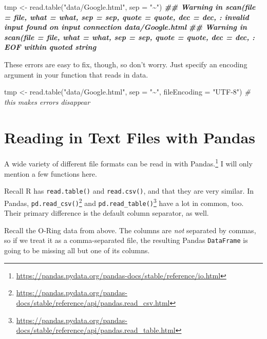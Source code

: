 \documentclass[
  12pt,
  krantz2]{krantz}
\makeatletter
\newenvironment{Shaded}{\begin{snugshade}}{\end{snugshade}}
\newcommand{\AttributeTok}[1]{\textcolor[rgb]{0.61,0.61,0.61}{#1}}
\newcommand{\CommentTok}[1]{\textcolor[rgb]{0.37,0.37,0.37}{\textit{#1}}}
\newcommand{\DocumentationTok}[1]{\textcolor[rgb]{0.37,0.37,0.37}{\textbf{\textit{#1}}}}
\newcommand{\FunctionTok}[1]{\textcolor[rgb]{0,0,0}{#1}}
\newcommand{\NormalTok}[1]{#1}
\newcommand{\OtherTok}[1]{\textcolor[rgb]{0.37,0.37,0.37}{#1}}
\newcommand{\StringTok}[1]{\textcolor[rgb]{0.5,0.5,0.5}{#1}}
\renewcommand{\href}[2]{#2\footnote{\url{#1}}}
\newenvironment{kframe}{%
\medskip{}
\setlength{\fboxsep}{.8em}
 \def\at@end@of@kframe{}%
 \ifinner\ifhmode%
  \def\at@end@of@kframe{\end{minipage}}%
  \begin{minipage}{\columnwidth}%
 \fi\fi%
 \def\FrameCommand##1{\hskip\@totalleftmargin \hskip-\fboxsep
 \colorbox{shadecolor}{##1}\hskip-\fboxsep
     \hskip-\linewidth \hskip-\@totalleftmargin \hskip\columnwidth}%
 \MakeFramed {\advance\hsize-\width
   \@totalleftmargin\z@ \linewidth\hsize
   \@setminipage}}%
 {\par\unskip\endMakeFramed%
 \at@end@of@kframe}
\renewenvironment{Shaded}{\begin{kframe}}{\end{kframe}}
\makeatother
\begin{document}
\begin{Shaded}
\begin{Highlighting}[]
\NormalTok{tmp }\OtherTok{\textless{}{-}} \FunctionTok{read.table}\NormalTok{(}\StringTok{"data/Google.html"}\NormalTok{, }\AttributeTok{sep =} \StringTok{"\textasciitilde{}"}\NormalTok{)}
\DocumentationTok{\#\# Warning in scan(file = file, what = what, sep = sep, quote = quote, dec = dec, : invalid input found on input connection \textquotesingle{}data/Google.html\textquotesingle{}}
\DocumentationTok{\#\# Warning in scan(file = file, what = what, sep = sep, quote = quote, dec = dec, : EOF within quoted string}
\end{Highlighting}
\end{Shaded}

These errors are easy to fix, though, so don't worry. Just specify an encoding argument in your function that reads in data.

\begin{Shaded}
\begin{Highlighting}[]
\NormalTok{tmp }\OtherTok{\textless{}{-}} \FunctionTok{read.table}\NormalTok{(}\StringTok{"data/Google.html"}\NormalTok{, }\AttributeTok{sep =} \StringTok{"\textasciitilde{}"}\NormalTok{, }
                  \AttributeTok{fileEncoding =} \StringTok{"UTF{-}8"}\NormalTok{) }\CommentTok{\# this makes errors disappear}
\end{Highlighting}
\end{Shaded}

\hypertarget{reading-in-text-files-with-pandas}{%
\section{Reading in Text Files with Pandas}\label{reading-in-text-files-with-pandas}}

A \href{https://pandas.pydata.org/pandas-docs/stable/reference/io.html}{wide variety of different file formats can be read in with Pandas.} I will only mention a few functions here.

Recall R has \texttt{read.table()} and \texttt{read.csv()}, and that they are very similar. In Pandas, \href{https://pandas.pydata.org/pandas-docs/stable/reference/api/pandas.read_csv.html}{\texttt{pd.read\_csv()}} and \href{https://pandas.pydata.org/pandas-docs/stable/reference/api/pandas.read_table.html}{\texttt{pd.read\_table()}} have a lot in common, too. Their primary difference is the default column separator, as well.

Recall the O-Ring data from above. The columns are \emph{not} separated by commas, so if we treat it as a comma-separated file, the resulting Pandas \texttt{DataFrame} is going to be missing all but one of its columns.
\end{document}
